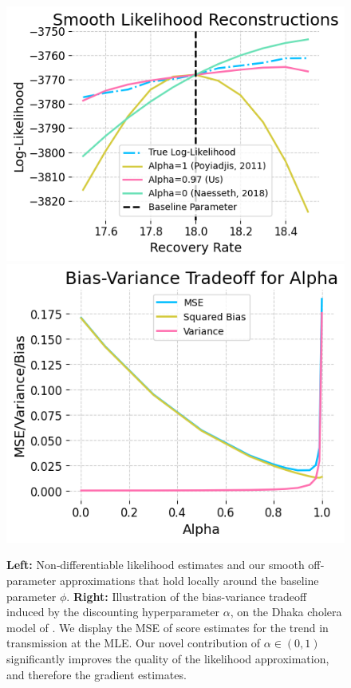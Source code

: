 \documentclass[numsec,webpdf,modern,medium,namedate]{oup-authoring-template}
\newcommand\arxiv[2]{#2} %
\theoremstyle{thmstyleone}%
\theoremstyle{thmstyletwo}%
\theoremstyle{thmstylethree}%
\begin{document}
\begin{figure}[htbp!]
  \centering
    \includegraphics[width=\arxiv{10cm}{\textwidth/\real{2}}]{imgs/095/mop.png}
    \includegraphics[width=\arxiv{10cm}{\textwidth/\real{2.2}}]{imgs/095/biasvar.png}
    \caption{\textbf{Left:} Non‐differentiable likelihood estimates and our smooth off‐parameter approximations that hold locally around the baseline parameter $\phi$. \textbf{Right:} Illustration of the bias-variance tradeoff induced by the discounting hyperparameter $\alpha$, on the Dhaka cholera model of \cite{king08}. We display the MSE of score estimates for the trend in transmission at the MLE. Our novel contribution of $\alpha \in (0,1)$ significantly improves the quality of the likelihood approximation, and therefore the gradient estimates. }
    \label{fig:biasvar}
    \arxiv{}{\vspace*{-1ex}}
\end{figure}
\end{document}
